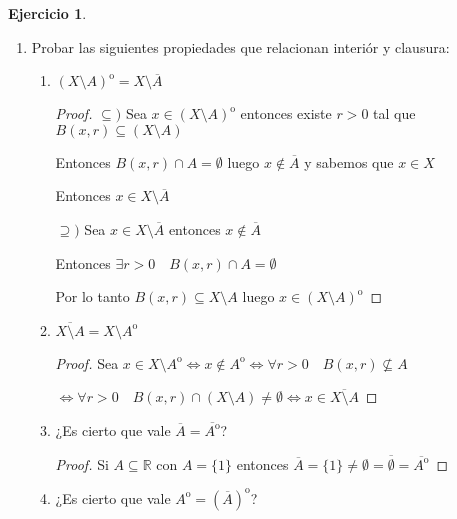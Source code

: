 \documentclass[12pt]{report}
\newcommand{\R}{\mathbb{R}}
\newcommand{\N}{\mathbb{N}}
\newcommand{\ra}{\rightarrow}
\newcommand{\ol}{\overline}
\newcommand{\open}{\mathrm{o}}
\theoremstyle{definition}
\newtheorem{ej}{Ejercicio}
\begin{document}
\begin{ej}
\begin{enumerate}
\begin{enumerate}
\begin{proof}
	  Juntando todo $\forall \epsilon > 0 \quad \exists n_0 \in \N$ tal que $d(x,a_n) \leq \epsilon \quad \forall n \geq n_0$

	  Entonces $a_n \ra x$

	$\Leftarrow ) $ Sea $a_{n} \in A \quad \forall n \in \N$ tal que $a_{n} \ra x $

	Entonces $\forall \epsilon > 0 \quad \exists a_{n} \in A $ tal que $d(x,a_{n}) \leq \epsilon$

	Luego $\forall \epsilon > 0$ tenemos $a_{n} \in B(x, \epsilon)$ con $a_{n} \in A$

      Por lo que $B(x,\epsilon) \cap A \neq \emptyset$

      Entonces $x \in \ol A$
	\end{proof}
      \end{enumerate}

    \item Probar las siguientes propiedades que relacionan interiór y clausura:
      \begin{enumerate}
	\item $(X \setminus A)^{\open} = X \setminus \ol A$
	  \begin{proof}
	  $\subseteq ) $ Sea $x \in (X\setminus A)^{\open}$ entonces existe $r>0$ tal que $B(x,r) \subseteq (X \setminus A)$

	    Entonces $B(x,r) \cap A = \emptyset$ luego $x \notin \ol A$ y sabemos que $x \in X$

	    Entonces $x \in X \setminus \ol A$

	  $\supseteq )$ Sea $x \in X \setminus \ol A$ entonces $x \notin \ol A$

	  Entonces $\exists r>0 \quad B(x,r) \cap A = \emptyset$

	Por lo tanto $B(x,r) \subseteq X \setminus A$ luego $x \in (X \setminus A)^{\open}$
	  \end{proof}
	\item $\ol{X \setminus A} = X \setminus A^{\open}$
	  \begin{proof}
	  Sea $x \in X\setminus A^{\open} \iff x \notin A^{\open} \iff \forall r > 0 \quad B(x,r) \not\subseteq A$ 

	  $\iff \forall r>0 \quad B(x,r) \cap (X\setminus A) \neq \emptyset \iff x \in \ol{X \setminus A}$
	  \end{proof}
	\item ¿Es cierto que vale $\ol A = \ol{A^{\open}}$?
	  \begin{proof}
	    Si $A \subseteq \R$ con $A = \{1\}$ entonces $\ol A = \{1\} \neq \emptyset = \ol{\emptyset} = \ol{A^{\open}}$
	  \end{proof}
	\item ¿Es cierto que vale $A^{\open} = (\ol A)^{\open}$? 
	  

\end{enumerate}
\end{enumerate}
\end{ej}
\end{document}
